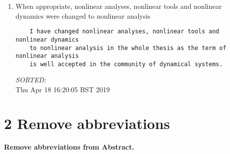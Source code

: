 \documentclass[12pt]{article}
\begin{document}
\begin{enumerate}
\item  	When appropriate, nonlinear analyses, nonlinear tools and 
	nonlinear dynamics were changed to nonlinear analysis
	\begin{verbatim}
	I have changed nonlinear analyses, nonlinear tools and nonlinear dynamics 
	to nonlinear analysis in the whole thesis as the term of nonlinear analysis 
	is well accepted in the community of dynamical systems.
	\end{verbatim}
	\textit{
	SORTED:  
	}
	\\



Thu Apr 18 16:20:05 BST 2019

\end{enumerate}


\section*{2 Remove abbreviations}
\textbf{Remove abbreviations from Abstract.}
\end{document}
